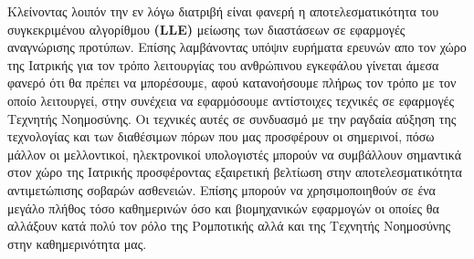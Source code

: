 Κλείνοντας λοιπόν την εν λόγω διατριβή είναι φανερή η αποτελεσματικότητα του συγκεκριμένου αλγορίθμου \textbf{(\textlatin{LLE})} μείωσης των διαστάσεων σε εφαρμογές αναγνώρισης προτύπων. Επίσης λαμβάνοντας υπόψιν ευρήματα ερευνών απο τον χώρο της Ιατρικής για τον τρόπο λειτουργίας του ανθρώπινου εγκεφάλου γίνεται άμεσα φανερό ότι θα πρέπει να μπορέσουμε, αφού κατανοήσουμε πλήρως τον τρόπο με τον οποίο λειτουργεί, στην συνέχεια να εφαρμόσουμε αντίστοιχες τεχνικές σε εφαρμογές Τεχνητής Νοημοσύνης. Οι τεχνικές αυτές σε συνδυασμό με την ραγδαία αύξηση της τεχνολογίας και των διαθέσιμων πόρων που μας προσφέρουν οι σημερινοί, πόσω μάλλον οι μελλοντικοί, ηλεκτρονικοί υπολογιστές μπορούν να συμβάλλουν σημαντικά στον χώρο της Ιατρικής προσφέροντας εξαιρετική βελτίωση στην αποτελεσματικότητα αντιμετώπισης σοβαρών ασθενειών. Επίσης μπορούν να χρησιμοποιηθούν σε ένα μεγάλο πλήθος τόσο καθημερινών όσο και βιομηχανικών εφαρμογών οι οποίες θα αλλάξουν κατά πολύ τον ρόλο της Ρομποτικής αλλά και της Τεχνητής Νοημοσύνης στην καθημερινότητα μας.
